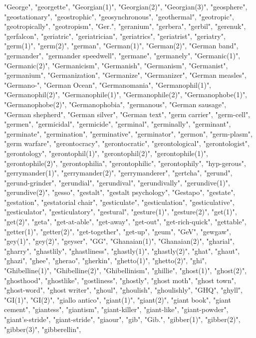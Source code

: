 "George",
"georgette",
"Georgian(1)",
"Georgian(2)",
"Georgian(3)",
"geosphere",
"geostationary",
"geostrophic",
"geosynchronous",
"geothermal",
"geotropic",
"geotropically",
"geotropism",
"Ger.",
"geranium",
"gerbera",
"gerbil",
"gerenuk",
"gerfalcon",
"geriatric",
"geriatrician",
"geriatrics",
"geriatrist",
"geriatry",
"germ(1)",
"germ(2)",
"german",
"German(1)",
"German(2)",
"German band",
"germander",
"germander speedwell",
"germane",
"germanely",
"Germanic(1)",
"Germanic(2)",
"Germanicism",
"Germanish",
"Germanism",
"Germanist",
"germanium",
"Germanization",
"Germanize",
"Germanizer",
"German measles",
"Germano-",
"German Ocean",
"Germanomania",
"Germanophil(1)",
"Germanophil(2)",
"Germanophile(1)",
"Germanophile(2)",
"Germanophobe(1)",
"Germanophobe(2)",
"Germanophobia",
"germanous",
"German sausage",
"German shepherd",
"German silver",
"German text",
"germ carrier",
"germ-cell",
"germen",
"germicidal",
"germicide",
"germinal",
"germinally",
"germinant",
"germinate",
"germination",
"germinative",
"germinator",
"germon",
"germ-plasm",
"germ warfare",
"gerontocracy",
"gerontocratic",
"gerontological",
"gerontologist",
"gerontology",
"gerontophil(1)",
"gerontophil(2)",
"gerontophile(1)",
"gerontophile(2)",
"gerontophilia",
"gerontophilic",
"gerontophily",
"hyp-gerous",
"gerrymander(1)",
"gerrymander(2)",
"gerrymanderer",
"gertcha",
"gerund",
"gerund-grinder",
"gerundial",
"gerundival",
"gerundivally",
"gerundive(1)",
"gerundive(2)",
"gesso",
"gestalt",
"gestalt psychology",
"Gestapo",
"gestate",
"gestation",
"gestatorial chair",
"gesticulate",
"gesticulation",
"gesticulative",
"gesticulator",
"gesticulatory",
"gestural",
"gesture(1)",
"gesture(2)",
"get(1)",
"get(2)",
"geta",
"get-at-able",
"get-away",
"get-out",
"get-rich-quick",
"gettable",
"getter(1)",
"getter(2)",
"get-together",
"get-up",
"geum",
"GeV",
"gewgaw",
"gey(1)",
"gey(2)",
"geyser",
"GG",
"Ghanaian(1)",
"Ghanaian(2)",
"gharial",
"gharry",
"ghastlily",
"ghastliness",
"ghastly(1)",
"ghastly(2)",
"ghat",
"ghaut",
"ghazi",
"ghee",
"gherao",
"gherkin",
"ghetto(1)",
"ghetto(2)",
"ghi",
"Ghibelline(1)",
"Ghibelline(2)",
"Ghibellinism",
"ghillie",
"ghost(1)",
"ghost(2)",
"ghosthood",
"ghostlike",
"gostliness",
"ghostly",
"ghost moth",
"ghost town",
"ghost-word",
"ghost writer",
"ghoul",
"ghoulish",
"ghoulishly",
"GHQ",
"ghyll",
"GI(1)",
"GI(2)",
"giallo antico",
"giant(1)",
"giant(2)",
"giant book",
"giant cement",
"giantess",
"giantism",
"giant-killer",
"giant-like",
"giant-powder",
"giant's-stride",
"giant-stride",
"giaour",
"gib",
"Gib.",
"gibber(1)",
"gibber(2)",
"gibber(3)",
"gibberellin",
